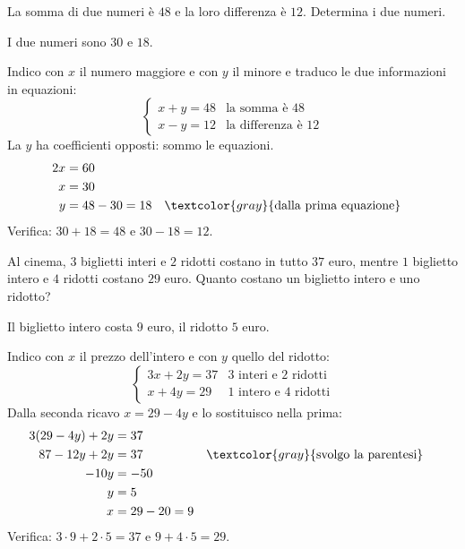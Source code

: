 

\begin{question}[ID=3.1, subtitle={Somma e differenza di due numeri}, difficulty=facile, tags={sistemi, problemi}]
La somma di due numeri è $48$ e la loro differenza è $12$. Determina i due numeri.
\begin{solution}
I due numeri sono $30$ e $18$.
\end{solution}
\begin{explanation}
Indico con $x$ il numero maggiore e con $y$ il minore e traduco le due informazioni in equazioni:
\[ \begin{cases} x+y=48 & \text{la somma è $48$}\\ x-y=12 & \text{la differenza è $12$}\end{cases} \]
La $y$ ha coefficienti opposti: sommo le equazioni.
\[\begin{aligned}
2x &= 60\\
x &= 30\\
y &= 48-30=18 && \textcolor{gray}{\text{dalla prima equazione}}
\end{aligned}\]
Verifica: $30+18=48$ e $30-18=12$.
\end{explanation}
\end{question}


\begin{question}[ID=3.2, subtitle={Biglietti del cinema}, difficulty=media, tags={sistemi, problemi}]
Al cinema, $3$ biglietti interi e $2$ ridotti costano in tutto $37$ euro, mentre $1$ biglietto intero e $4$ ridotti costano $29$ euro. Quanto costano un biglietto intero e uno ridotto?
\begin{solution}
Il biglietto intero costa $9$ euro, il ridotto $5$ euro.
\end{solution}
\begin{explanation}
Indico con $x$ il prezzo dell'intero e con $y$ quello del ridotto:
\[ \begin{cases} 3x+2y=37 & \text{3 interi e 2 ridotti}\\ x+4y=29 & \text{1 intero e 4 ridotti}\end{cases} \]
Dalla seconda ricavo $x=29-4y$ e lo sostituisco nella prima:
\[\begin{aligned}
3(29-4y)+2y &= 37\\
87-12y+2y &= 37 && \textcolor{gray}{\text{svolgo la parentesi}}\\
-10y &= -50\\
y &= 5\\
x &= 29-20=9
\end{aligned}\]
Verifica: $3\cdot9+2\cdot5=37$ e $9+4\cdot5=29$.
\end{explanation}
\end{question}

